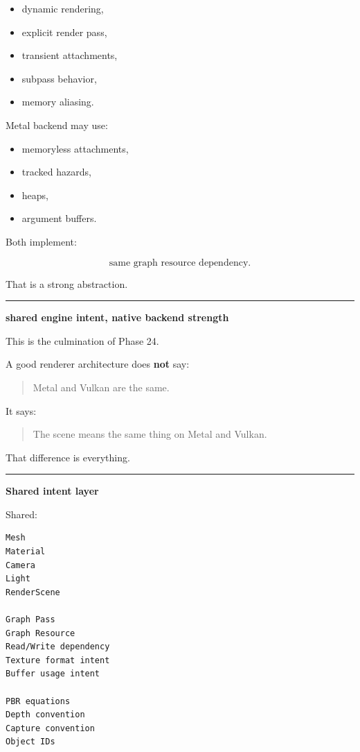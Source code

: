 \begin{itemize}
\tightlist
\item
  dynamic rendering,
\item
  explicit render pass,
\item
  transient attachments,
\item
  subpass behavior,
\item
  memory aliasing.
\end{itemize}

Metal backend may use:

\begin{itemize}
\tightlist
\item
  memoryless attachments,
\item
  tracked hazards,
\item
  heaps,
\item
  argument buffers.
\end{itemize}

Both implement:

\[
\text{same graph resource dependency}.
\]

That is a strong abstraction.

\begin{center}\rule{0.5\linewidth}{0.5pt}\end{center}

\textbf{shared engine intent, native backend strength}

This is the culmination of Phase 24.

A good renderer architecture does \textbf{not} say:

\begin{quote}
Metal and Vulkan are the same.
\end{quote}

It says:

\begin{quote}
The scene means the same thing on Metal and Vulkan.
\end{quote}

That difference is everything.

\begin{center}\rule{0.5\linewidth}{0.5pt}\end{center}

\textbf{Shared intent layer}

Shared:

\begin{verbatim}
Mesh
Material
Camera
Light
RenderScene

Graph Pass
Graph Resource
Read/Write dependency
Texture format intent
Buffer usage intent

PBR equations
Depth convention
Capture convention
Object IDs
\end{verbatim}


